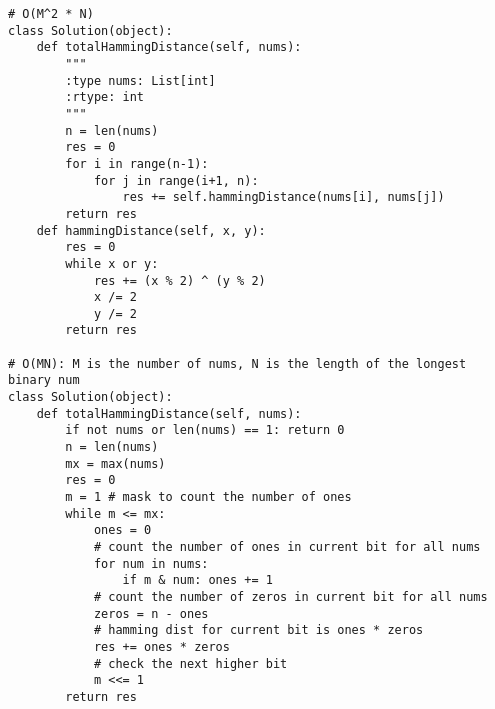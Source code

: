 \begin{lstlisting}
# O(M^2 * N)
class Solution(object):
    def totalHammingDistance(self, nums):
        """
        :type nums: List[int]
        :rtype: int
        """
        n = len(nums)
        res = 0
        for i in range(n-1):
            for j in range(i+1, n):
                res += self.hammingDistance(nums[i], nums[j])
        return res
    def hammingDistance(self, x, y):
        res = 0
        while x or y:
            res += (x % 2) ^ (y % 2)
            x /= 2
            y /= 2
        return res
    
# O(MN): M is the number of nums, N is the length of the longest binary num
class Solution(object):
    def totalHammingDistance(self, nums):
        if not nums or len(nums) == 1: return 0
        n = len(nums)
        mx = max(nums)
        res = 0
        m = 1 # mask to count the number of ones
        while m <= mx:
            ones = 0
            # count the number of ones in current bit for all nums
            for num in nums:
                if m & num: ones += 1
            # count the number of zeros in current bit for all nums
            zeros = n - ones
            # hamming dist for current bit is ones * zeros
            res += ones * zeros
            # check the next higher bit
            m <<= 1
        return res
\end{lstlisting}

